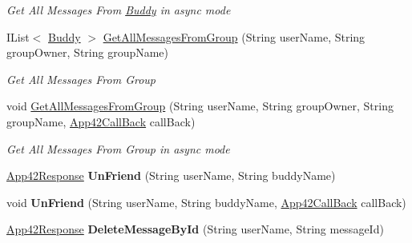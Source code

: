 \begin{DoxyCompactItemize}
\begin{DoxyCompactList}\small\item\em Get All Messages From \hyperlink{classcom_1_1shephertz_1_1app42_1_1paas_1_1sdk_1_1csharp_1_1buddy_1_1_buddy}{Buddy} in async mode \end{DoxyCompactList}\item 
I\+List$<$ \hyperlink{classcom_1_1shephertz_1_1app42_1_1paas_1_1sdk_1_1csharp_1_1buddy_1_1_buddy}{Buddy} $>$ \hyperlink{classcom_1_1shephertz_1_1app42_1_1paas_1_1sdk_1_1csharp_1_1buddy_1_1_buddy_service_adaa8a222a491650fe1c7615909818682}{Get\+All\+Messages\+From\+Group} (String user\+Name, String group\+Owner, String group\+Name)
\begin{DoxyCompactList}\small\item\em Get All Messages From Group \end{DoxyCompactList}\item 
void \hyperlink{classcom_1_1shephertz_1_1app42_1_1paas_1_1sdk_1_1csharp_1_1buddy_1_1_buddy_service_a62b1a0cf73486286c0dc50e2148c9ba9}{Get\+All\+Messages\+From\+Group} (String user\+Name, String group\+Owner, String group\+Name, \hyperlink{interfacecom_1_1shephertz_1_1app42_1_1paas_1_1sdk_1_1csharp_1_1_app42_call_back}{App42\+Call\+Back} call\+Back)
\begin{DoxyCompactList}\small\item\em Get All Messages From Group in async mode \end{DoxyCompactList}\item 
\hypertarget{classcom_1_1shephertz_1_1app42_1_1paas_1_1sdk_1_1csharp_1_1buddy_1_1_buddy_service_a1ce36fc03895ed584a4e7845e0e09872}{\hyperlink{classcom_1_1shephertz_1_1app42_1_1paas_1_1sdk_1_1csharp_1_1_app42_response}{App42\+Response} {\bfseries Un\+Friend} (String user\+Name, String buddy\+Name)}\label{classcom_1_1shephertz_1_1app42_1_1paas_1_1sdk_1_1csharp_1_1buddy_1_1_buddy_service_a1ce36fc03895ed584a4e7845e0e09872}

\item 
\hypertarget{classcom_1_1shephertz_1_1app42_1_1paas_1_1sdk_1_1csharp_1_1buddy_1_1_buddy_service_ab593136d3164b790a0741350a126758d}{void {\bfseries Un\+Friend} (String user\+Name, String buddy\+Name, \hyperlink{interfacecom_1_1shephertz_1_1app42_1_1paas_1_1sdk_1_1csharp_1_1_app42_call_back}{App42\+Call\+Back} call\+Back)}\label{classcom_1_1shephertz_1_1app42_1_1paas_1_1sdk_1_1csharp_1_1buddy_1_1_buddy_service_ab593136d3164b790a0741350a126758d}

\item 
\hypertarget{classcom_1_1shephertz_1_1app42_1_1paas_1_1sdk_1_1csharp_1_1buddy_1_1_buddy_service_ae572882cfd1a33842bb9f41050c42fab}{\hyperlink{classcom_1_1shephertz_1_1app42_1_1paas_1_1sdk_1_1csharp_1_1_app42_response}{App42\+Response} {\bfseries Delete\+Message\+By\+Id} (String user\+Name, String message\+Id)}\label{classcom_1_1shephertz_1_1app42_1_1paas_1_1sdk_1_1csharp_1_1buddy_1_1_buddy_service_ae572882cfd1a33842bb9f41050c42fab}


\end{DoxyCompactItemize}
